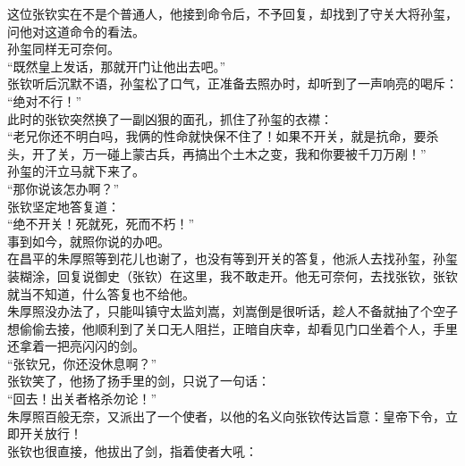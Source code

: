 \begin{multicols}{\theparacolNo}
这位张钦实在不是个普通人，他接到命令后，不予回复，却找到了守关大将孙玺，问他对这道命令的看法。\\

孙玺同样无可奈何。\\

“既然皇上发话，那就开门让他出去吧。”\\

张钦听后沉默不语，孙玺松了口气，正准备去照办时，却听到了一声响亮的喝斥：\\

“绝对不行！”\\

此时的张钦突然换了一副凶狠的面孔，抓住了孙玺的衣襟：\\

“老兄你还不明白吗，我俩的性命就快保不住了！如果不开关，就是抗命，要杀头，开了关，万一碰上蒙古兵，再搞出个土木之变，我和你要被千刀万剐！”\\

孙玺的汗立马就下来了。\\

“那你说该怎办啊？”\\

张钦坚定地答复道：\\

“绝不开关！死就死，死而不朽！”\\

事到如今，就照你说的办吧。\\

在昌平的朱厚照等到花儿也谢了，也没有等到开关的答复，他派人去找孙玺，孙玺装糊涂，回复说御史（张钦）在这里，我不敢走开。他无可奈何，去找张钦，张钦就当不知道，什么答复也不给他。\\

朱厚照没办法了，只能叫镇守太监刘嵩，刘嵩倒是很听话，趁人不备就抽了个空子想偷偷去接，他顺利到了关口无人阻拦，正暗自庆幸，却看见门口坐着个人，手里还拿着一把亮闪闪的剑。\\

“张钦兄，你还没休息啊？”\\

张钦笑了，他扬了扬手里的剑，只说了一句话：\\

“回去！出关者格杀勿论！”\\

朱厚照百般无奈，又派出了一个使者，以他的名义向张钦传达旨意：皇帝下令，立即开关放行！\\

张钦也很直接，他拔出了剑，指着使者大吼：\\


\end{multicols}
